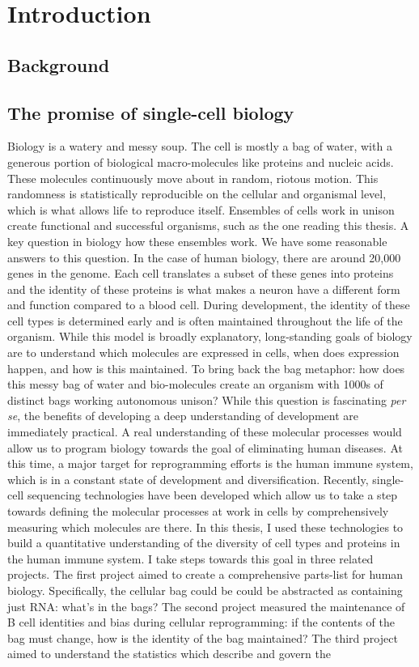 \chapter{Introduction}

\section{Background}

\section{The promise of single-cell biology}

Biology is a watery and messy soup. The cell is mostly a bag of water, with a generous portion of biological macro-molecules like proteins and nucleic acids. These molecules continuously move about in random, riotous motion\cite{berg1993random}. This randomness is statistically reproducible on the cellular and organismal level, which is what allows life to reproduce itself. Ensembles of cells work in unison create functional and successful organisms, such as the one reading this thesis. A key question in biology how these ensembles work. We have some reasonable answers to this question. In the case of human biology, there are around 20,000 genes in the genome. Each cell translates a subset of these genes into proteins and the identity of these proteins is what makes a neuron have a different form and function compared to a blood cell. During development, the identity of these cell types is determined early and is often maintained throughout the life of the organism. While this model is broadly explanatory, long-standing goals of biology are to understand which molecules are expressed in cells, when does expression happen, and how is this maintained. To bring back the bag metaphor: how does this messy bag of water and bio-molecules create an organism with 1000s of distinct bags working autonomous unison? While this question is fascinating \textit{per se}, the benefits of developing a deep understanding of development are immediately practical. A real understanding of these molecular processes would allow us to program biology towards the goal of eliminating human diseases. At this time, a major target for reprogramming efforts is the human immune system, which is in a constant state of development and diversification. Recently, single-cell sequencing technologies have been developed which allow us to take a step towards defining the molecular processes at work in cells by comprehensively measuring which molecules are there. In this thesis, I used these technologies to build a quantitative understanding of the diversity of cell types and proteins in the human immune system. I take steps towards this goal in three related projects. The first project aimed to create a comprehensive parts-list for human biology. Specifically, the cellular bag could be could be abstracted as containing just RNA\cite{quake2021cell}: what's in the bags?  The second project measured the maintenance of B cell identities and bias during cellular reprogramming: if the contents of the bag must change, how is the identity of the bag maintained? The third project aimed to understand the statistics which describe and govern the 